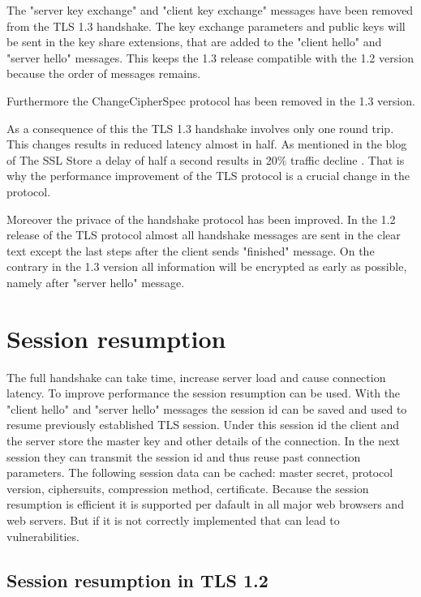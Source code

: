 The "server key exchange" and "client key exchange" messages have been removed from the TLS 1.3 handshake. The key exchange parameters and public keys will be sent in the key share extensions, that are added to the "client hello" and "server hello" messages. This keeps the 1.3 release compatible with the 1.2 version because the order of messages remains.

Furthermore the ChangeCipherSpec protocol has been removed in the 1.3 version. 

As a consequence of this the TLS 1.3 handshake involves only one round trip. This changes results in reduced latency almost in half. As mentioned in the blog of The SSL Store a delay of half a second results in 20\% traffic decline \cite{sslstore:handshake}. That is why the performance improvement of the TLS protocol is a crucial change in the protocol.

Moreover the privace of the handshake protocol has been improved. In the 1.2 release of the TLS protocol almost all handshake messages are sent in the clear text except the last steps after the client sends "finished" message. On the contrary in the 1.3 version all information will be encrypted as early as possible, namely after "server hello" message. 

\section{Session resumption}
\label{sec:comparison_resumption}

The full handshake can take time, increase server load and cause connection latency. To improve performance the session resumption can be used. With the "client hello" and "server hello" messages the session id can be saved and used to resume previously established TLS session. Under this session id the client and the server store the master key and other details of the connection. In the next session they can transmit the session id and thus reuse past connection parameters. The following session data can be cached: master secret, protocol version, ciphersuits, compression method, certificate. Because the session resumption is efficient it is supported per dafault in all major web browsers and web servers. But if it is not correctly implemented that can lead to vulnerabilities.

\subsection{Session resumption in TLS 1.2}
\label{subsec:resumption1_2}


